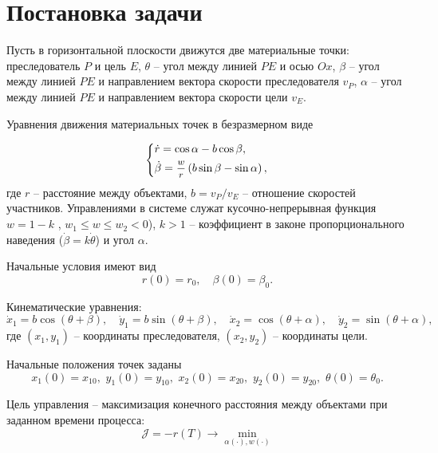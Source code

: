 \documentclass[a4paper,12pt, openany]{book}
\theoremstyle{plain} %
\theoremstyle{definition} %
\theoremstyle{remark} %
\numberwithin{equation}{chapter}
\begin{document}
{\section{Постановка задачи} Пусть в горизонтальной плоскости движутся две материальные точки:  преследователь $P$ и цель $E$, $\theta$ -- угол между линией $PE$ и осью $Ox$, $\beta$ -- угол между линией $PE$ и направлением вектора скорости преследователя $v_P$, $\alpha$ -- угол между линией $PE$ и направлением вектора скорости цели $v_E$. 


Уравнения движения материальных точек в безразмерном виде

\begin{equation}\label{4.1}
\left\{ {\begin{aligned}
   & \dot r = \cos \alpha  - b\cos \beta , \hfill  \\
   & \dot \beta  = \mfrac{w}
{r}\left( {b\sin \beta  - \sin \alpha } \right), \hfill  \\
 \end{aligned} } \right.
\end{equation} 
где $r$ -- расстояние между объектами,  $b = v_P/v_E$ -- отношение скоростей участников. Управлениями в системе служат кусочно-непрерывная функция $w = 1-k$ , $w_1 \leqslant w \leqslant w_2 < 0$), $k>1$ -- коэффициент в законе пропорционального наведения ($\dot\beta = k\dot\theta$) и угол $\alpha$. 

Начальные условия имеют вид
\begin{equation}\label{4.2}
	r(0) = r_0, \quad \beta(0) = \beta_0.
\end{equation}

Кинематические уравнения:
\begin{equation}\label{4.3}
\dot x_1  = b\cos \left( {\theta  + \beta } \right), \quad \dot y_1  = b\sin \left( {\theta  + \beta } \right), \quad \dot x_2  = \cos \left( {\theta  + \alpha } \right), \quad \dot y_2  = \sin \left( {\theta  + \alpha } \right),
\end{equation}
где $(x_1,y_1)$ -- координаты преследователя, $(x_2,y_2)$ -- координаты цели.

Начальные положения точек заданы
\begin{equation}\label{4.4}
x_1 \left( 0 \right) = x_{10} ,\,\,y_1 \left( 0 \right) = y_{10} ,\,\,x_2 \left( 0 \right) = x_{20} ,\,\,y_2 \left( 0 \right) = y_{20} ,\,\,\theta \left( 0 \right) = \theta _0 .
\end{equation}

Цель управления -- максимизация конечного расстояния между объектами при заданном времени процесса:
\begin{equation}\label{4.5}
\mathcal{J} = -r(T) \longrightarrow \mathop {\min }\limits_{\alpha(\cdot),w(\cdot)} 
\end{equation}



}
\end{document}
